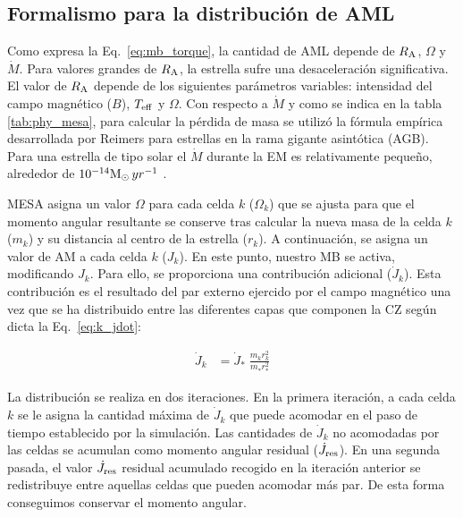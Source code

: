 \subsection{Formalismo para la distribución de AML} \label{mod_aml}
Como expresa la Eq.~\ref{eq:mb_torque}, la cantidad de AML depende de $R_{\mathrm{A}}$, $\Omega$ y $\Dot{M}$. Para valores grandes de $R_{\mathrm{A}}$, la estrella sufre una desaceleración significativa. El valor de $R_{\mathrm{A}}$ depende de los siguientes parámetros variables: intensidad del campo magnético ($B$), $T_{\mathrm{eff}}$ y $\Omega$. Con respecto a $\Dot{M}$ y como se indica en la tabla \ref{tab:phy_mesa}, para calcular la pérdida de masa se utilizó la fórmula empírica desarrollada por Reimers \cite{Reimers1975} para estrellas en la rama gigante asintótica (AGB). Para una estrella de tipo solar el $\Dot{M}$ durante la EM es relativamente pequeño, alrededor de $10^{-14}\mathrm{M}_\odot \, yr^{-1}$ \cite{Noerdlinger2008}. \par

MESA asigna un valor $\Omega$ para cada celda $k$ ($\Omega_k$) que se ajusta para que el momento angular resultante se conserve tras calcular la nueva masa de la celda $k$ ($m_k$) y su distancia al centro de la estrella ($r_k$). A continuación, se asigna un valor de AM a cada celda $k$ ($J_k$). En este punto, nuestro MB se activa, modificando $J_k$. Para ello, se proporciona una contribución adicional ($\Dot{J}_{k}$). Esta contribución es el resultado del par externo ejercido por el campo magnético una vez que se ha distribuido entre las diferentes capas que componen la CZ según dicta la Eq.~\ref{eq:k_jdot}:\par

\begin{ceqn}
\begin{align}
    \Dot{J}_{k} &= \Dot{J}_*\;\frac{m^{}_{k} r^2_{k}}{m^{}_* r_*^2} \label{eq:k_jdot}
\end{align}
\end{ceqn}

La distribución se realiza en dos iteraciones. En la primera iteración, a cada celda $k$ se le asigna la cantidad máxima de $\Dot{J}_{k}$ que puede acomodar en el paso de tiempo establecido por la simulación. Las cantidades de $\Dot{J}_{k}$ no acomodadas por las celdas se acumulan como momento angular residual ($\Dot{J}_{\mathrm{res}}$). En una segunda pasada, el valor $\Dot{J}_{\mathrm{res}}$ residual acumulado recogido en la iteración anterior se redistribuye entre aquellas celdas que pueden acomodar más par. De esta forma conseguimos conservar el momento angular.\par

\endinput
